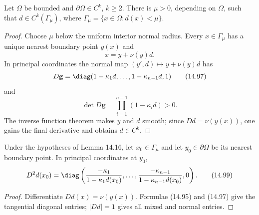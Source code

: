 \begin{lemma}
\label{gt14-boundary-gradient-14-16}
Let $\Omega$ be bounded and $\partial\Omega\in C^k$, $k\geq2$. There is
$\mu>0$, depending on $\Omega$, such that
$d\in C^k(\Gamma_\mu)$, where
$\Gamma_\mu=\{x\in\Omega:d(x)<\mu\}$.
\end{lemma}
\begin{proof}
\sketch Choose $\mu$ below the uniform interior normal radius. Every
$x\in\Gamma_\mu$ has a unique nearest boundary point $y(x)$ and
\begin{equation}
x=y+\nu(y)d.
\tag{14.96}
\end{equation}
In principal coordinates the normal map $(y',d)\mapsto y+\nu(y)d$ has
\begin{equation}
D\mathbf g=\diag(1-\kappa_1d,\ldots,1-\kappa_{n-1}d,1)
\tag{14.97}
\end{equation}
and
\begin{equation}
\det D\mathbf g=\prod_{i=1}^{n-1}(1-\kappa_id)>0.
\tag{14.98}
\end{equation}
The inverse function theorem makes $y$ and $d$ smooth; since
$Dd=\nu(y(x))$, one gains the final derivative and obtains $d\in C^k$.
\end{proof}

\begin{lemma}
\label{gt14-boundary-gradient-14-17}
Under the hypotheses of Lemma 14.16, let $x_0\in\Gamma_\mu$ and let
$y_0\in\partial\Omega$ be its nearest boundary point. In principal coordinates
at $y_0$,
\begin{equation}
D^2d(x_0)=\diag\left(
\frac{-\kappa_1}{1-\kappa_1d(x_0)},\ldots,
\frac{-\kappa_{n-1}}{1-\kappa_{n-1}d(x_0)},0\right).
\tag{14.99}
\end{equation}
\end{lemma}
\begin{proof}
\sketch Differentiate $Dd(x)=\nu(y(x))$. Formulae (14.95) and (14.97) give
the tangential diagonal entries; $|Dd|=1$ gives all mixed and normal entries.
\end{proof}

